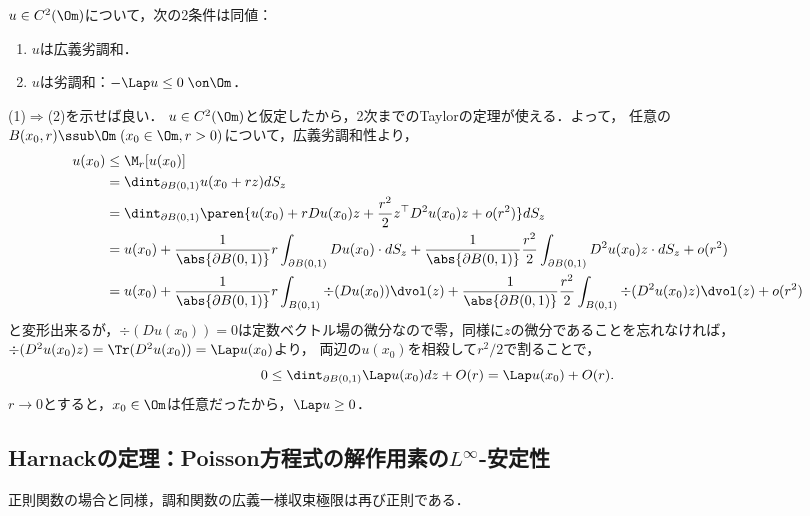 \documentclass[uplatex,dvipdfmx]{jsreport}
\begin{document}
\begin{theorem}[2つの定義の同値性]
    $u\in C^2(\Om)$について，次の2条件は同値：
    \begin{enumerate}
        \item $u$は広義劣調和．
        \item $u$は劣調和：$-\Lap u\le0\;\on\Om$．
    \end{enumerate}
\end{theorem}
\begin{Proof}
    (1)$\Rightarrow$(2)を示せば良い．
    $u\in C^2(\Om)$と仮定したから，2次までのTaylorの定理が使える．よって，
    任意の$B(x_0,r)\ssub\Om\;(x_0\in\Om,r>0)$について，広義劣調和性より，
    \begin{align*}
        u(x_0)&\le\M_r[u(x_0)]\\
        &=\dint_{\partial B(0,1)}u(x_0+rz)dS_z\\
        &=\dint_{\partial B(0,1)}\paren{u(x_0)+rDu(x_0)z+\frac{r^2}{2}z^\top D^2u(x_0)z+o(r^2)}dS_z\\
        &=u(x_0)+\frac{1}{\abs{\partial B(0,1)}}r\int_{\partial B(0,1)}Du(x_0)\cdot dS_z+\frac{1}{\abs{\partial B(0,1)}}\frac{r^2}{2}\int_{\partial B(0,1)}D^2u(x_0)z\cdot dS_z+o(r^2)\\
        &=u(x_0)+\frac{1}{\abs{\partial B(0,1)}}r\int_{B(0,1)}\div(Du(x_0))\dvol(z)+\frac{1}{\abs{\partial  B(0,1)}}\frac{r^2}{2}\int_{B(0,1)}\div(D^2u(x_0)z)\dvol(z)+o(r^2)
    \end{align*}
    と変形出来るが，$\div(Du(x_0))=0$は定数ベクトル場の微分なので零，同様に$z$の微分であることを忘れなければ，$\div(D^2u(x_0)z)=\Tr(D^2u(x_0))=\Lap u(x_0)$より，
    両辺の$u(x_0)$を相殺して$r^2/2$で割ることで，
    \[0\le\dint_{\partial B(0,1)}\Lap u(x_0)dz+O(r)=\Lap u(x_0)+O(r).\]
    $r\to0$とすると，$x_0\in\Om$は任意だったから，$\Lap u\ge0$．
\end{Proof}

\subsection{Harnackの定理：Poisson方程式の解作用素の$L^\infty$-安定性}

\begin{tcolorbox}[colframe=ForestGreen, colback=ForestGreen!10!white,breakable,colbacktitle=ForestGreen!40!white,coltitle=black,fonttitle=\bfseries\sffamily,
title=]
    正則関数の場合と同様，調和関数の広義一様収束極限は再び正則である．
\end{tcolorbox}
\end{document}
